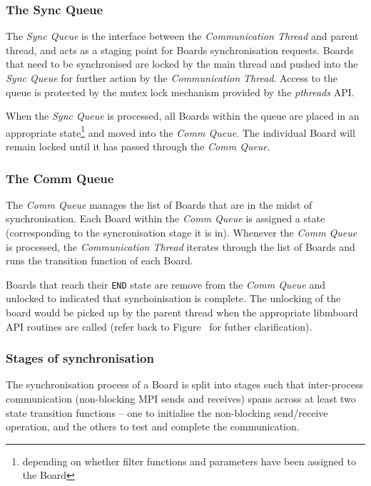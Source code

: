 \subsubsection{The Sync Queue}

The \textit{Sync Queue} is the interface between the \textit{Communication Thread} and parent thread, and acts as a staging point for Boards synchronisation requests. Boards that need to be synchronised are locked by the main thread and pushed into the \textit{Sync Queue} for further action by the \textit{Communication Thread}. Access to the queue is protected by the mutex lock mechanism provided by the \textit{pthreads} API.

When the \textit{Sync Queue} is processed, all Boards within the queue are placed in an appropriate state\footnote{depending on whether filter functions and parameters have been assigned to the Board} and moved into the \textit{Comm Queue}. The individual Board will remain locked until it has passed through the \textit{Comm Queue}.

\subsubsection{The Comm Queue}

The \textit{Comm Queue} manages the list of Boards that are in the midst of synchronisation. Each Board within the \textit{Comm Queue} is assigned a state (corresponding to the syncronisation stage it is in). Whenever the \textit{Comm Queue} is processed, the \textit{Communication Thread} iterates through the list of Boards and runs the transition function of each Board. 

Boards that reach their \texttt{END} state are remove from the \textit{Comm Queue} and unlocked to indicated that synchoinisation is complete. The unlocking of the board would be picked up by the parent thread when the appropriate libmboard API routines are called (refer back to Figure~\label{fig:syncboard} for futher clarification).

\subsubsection{Stages of synchronisation}

The synchronisation process of a Board is split into stages such that inter-process communication (non-blocking MPI sends and receives) spans across at least two state transition functions -- one to initialise the non-blocking send/receive operation, and the others to test and complete the communication.

